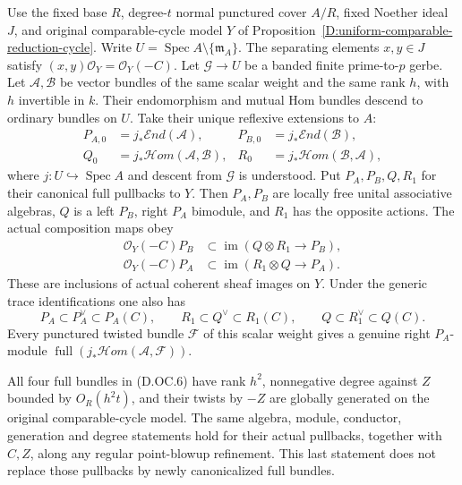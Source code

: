 \begin{proposition}
\label{D:canonical-order-Morita-conductor}
Use the fixed base $R$, degree-$t$ normal punctured cover
$A/R$, fixed Noether ideal $J$, and original comparable-cycle
model $Y$ of Proposition~\ref{D:uniform-comparable-reduction-cycle}.
Write $U=\operatorname{Spec}A\setminus\{\mathfrak m_A\}$.
The separating elements $x,y\in J$ satisfy
$(x,y)\mathcal O_Y=\mathcal O_Y(-C)$.
Let $\mathcal G\to U$ be a banded finite prime-to-$p$ gerbe.
Let $\mathcal A,\mathcal B$ be vector bundles of the same
scalar weight and the same rank $h$, with $h$ invertible in $k$.
Their endomorphism and mutual Hom bundles descend to ordinary
bundles on $U$. Take their unique reflexive extensions to $A$:
\[
 \begin{aligned}
 P_{A,0}&=j_*\mathcal End(\mathcal A),&
 P_{B,0}&=j_*\mathcal End(\mathcal B),\\
 Q_0&=j_*\mathcal Hom(\mathcal A,\mathcal B),&
 R_0&=j_*\mathcal Hom(\mathcal B,\mathcal A),
 \end{aligned}                                           \tag{D.OC.6}
\]
where $j:U\hookrightarrow\operatorname{Spec}A$ and descent
from $\mathcal G$ is understood. Put $P_A,P_B,Q,R_1$ for
their canonical full pullbacks to $Y$.
Then $P_A,P_B$ are locally free unital associative algebras,
$Q$ is a left $P_B$, right $P_A$ bimodule, and $R_1$ has the
opposite actions. The actual composition maps obey
\[
 \begin{split}
 \mathcal O_Y(-C)P_B
       &\subset\operatorname{im}(Q\otimes R_1\to P_B),\\
 \mathcal O_Y(-C)P_A
       &\subset\operatorname{im}(R_1\otimes Q\to P_A).
 \end{split}                                           \tag{D.OC.7}
\]
These are inclusions of actual coherent sheaf images on $Y$.
Under the generic trace identifications one also has
\[
 P_A\subset P_A^\vee\subset P_A(C),\qquad
 R_1\subset Q^\vee\subset R_1(C),\qquad
 Q\subset R_1^\vee\subset Q(C).                       \tag{D.OC.8}
\]
Every punctured twisted bundle $\mathcal F$ of this scalar
weight gives a genuine right $P_A$-module
$\operatorname{full}(j_*\mathcal Hom(\mathcal A,\mathcal F))$.

All four full bundles in (D.OC.6) have rank $h^2$,
nonnegative degree against $Z$ bounded by $O_R(h^2t)$,
and their twists by $-Z$ are globally generated on the
original comparable-cycle model. The same algebra, module,
conductor, generation and degree statements hold for their
actual pullbacks, together with $C,Z$, along any regular
point-blowup refinement. This last statement does not
replace those pullbacks by newly canonicalized full bundles.
\end{proposition}


